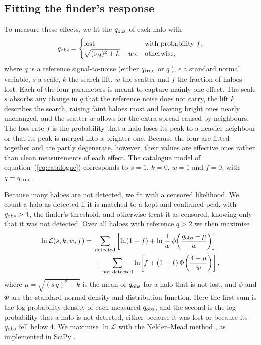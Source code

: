 \subsection{Fitting the finder's response}\label{sec:finder_fit}

To measure these effects, we fit the $q_\mathrm{obs}$ of each halo with
\begin{equation}
q_\mathrm{obs} =
\begin{cases}
\text{lost} & \text{with probability } f,\\
\sqrt{(s\,q)^2 + k} + w\,\epsilon & \text{otherwise},
\end{cases}
\label{eq:qobs_fit}
\end{equation}
where $q$ is a reference signal-to-noise (either $q_\mathrm{true}$ or $q_\mathrm{f}$), $\epsilon$ a standard normal
variable, $s$ a scale, $k$ the search lift, $w$ the scatter and $f$ the fraction of haloes lost. Each of the
four parameters is meant to capture mainly one effect. The scale $s$ absorbs any change in $q$ that the
reference noise does not carry, the lift $k$ describes the search, raising faint haloes most and leaving
bright ones nearly unchanged, and the scatter $w$ allows for the extra spread caused by neighbours. The loss
rate $f$ is the probability that a halo loses its peak to a heavier neighbour or that its peak is merged into
a brighter one. Because the four are fitted together and are partly degenerate, however, their values are
effective ones rather than clean measurements of each effect. The catalogue model of
equation~(\ref{eq:catalogue}) corresponds to $s = 1$, $k = 0$, $w = 1$ and $f = 0$, with $q = q_\mathrm{true}$.

Because many haloes are not detected, we fit with a censored likelihood. We count a halo as detected if it is
matched to a kept and confirmed peak with $q_\mathrm{obs} > 4$, the finder's threshold, and otherwise treat it as
censored, knowing only that it was not detected. Over all haloes with reference $q > 2$ we then maximise
\begin{equation}
\begin{split}
\ln\mathcal{L}(s,k,w,f) ={}& \sum_{\text{detected}} \left[\ln(1-f) + \ln\frac{1}{w}\,\phi\!\left(\frac{q_\mathrm{obs} - \mu}{w}\right)\right]\\
&+ \sum_{\text{not detected}} \ln\!\left[f + (1-f)\,\Phi\!\left(\frac{4 - \mu}{w}\right)\right],
\end{split}
\label{eq:censored}
\end{equation}
where $\mu = \sqrt{(s\,q)^2 + k}$ is the mean of $q_\mathrm{obs}$ for a halo that is not lost, and $\phi$ and $\Phi$ are
the standard normal density and distribution function. Here the first sum is the log-probability density of each
measured $q_\mathrm{obs}$, and the second is the log-probability that a halo is not detected, either because it was lost
or because its $q_\mathrm{obs}$ fell below 4. We maximise $\ln\mathcal{L}$ with the Nelder--Mead method
\citep{NelderMead1965}, as implemented in SciPy \citep{Virtanen2020}.


